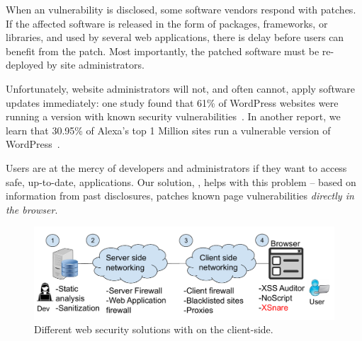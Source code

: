When an \xss vulnerability is disclosed, some software vendors respond
with patches. If the affected software is released in the form of
packages, frameworks, or libraries, and used by several web
applications, there is delay before users can benefit from the
patch. Most importantly, the patched software must be re-deployed by
site administrators.

Unfortunately, website administrators will not, and often cannot,
apply software updates immediately: one study found
that 61\% of WordPress websites were running a version with known
security vulnerabilities~\cite{Sucuri}. In another report, we learn
that 30.95\% of Alexa's top 1 Million sites run a vulnerable version
of WordPress~\cite{wpwhitesecurity}.

Users are at the mercy of developers and administrators if
they want to access safe, up-to-date, applications. Our solution, \sys,
helps with this problem -- based on information from past disclosures,
\sys patches known page vulnerabilities \emph{directly in the browser}.

\begin{figure}[h]
  \includegraphics[scale=0.37]{img/web_app_architecture.pdf}
  \vspace*{-5.0ex}
  \caption{Different web security solutions with \sys on the client-side.}
  \label{fig:web_architecture}
\end{figure}

